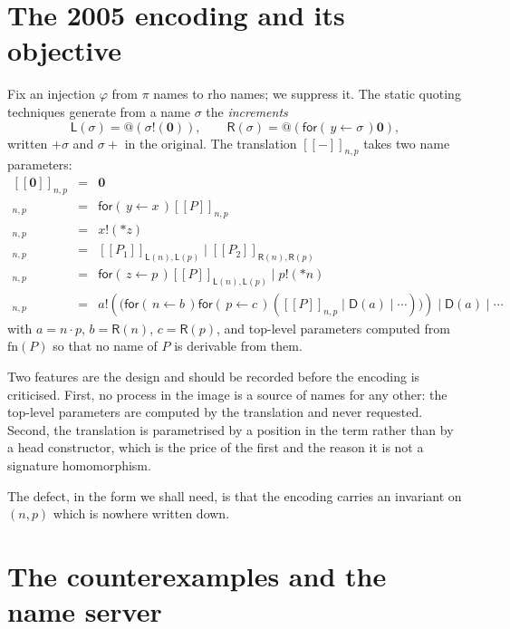 \documentclass[11pt]{article}
\makeatletter
\theoremstyle{definition}
\theoremstyle{plain}
\theoremstyle{remark}
\newcommand{\quo}[1]{@#1}
\newcommand{\drp}[1]{{*}#1}
\newcommand{\inp}[3]{\mathsf{for}(\,#1 \leftarrow #2\,)#3}
\newcommand{\out}[2]{#1!(#2)}
\newcommand{\enc}[1]{[\![#1]\!]}
\newcommand{\nil}{\mathbf{0}}
\newcommand{\Lft}{\mathsf{L}}
\newcommand{\Rgt}{\mathsf{R}}
\newcommand{\Dup}{\mathsf{D}}
\newcommand{\fn}{\mathrm{fn}}
\makeatother
\begin{document}
\section{The 2005 encoding and its objective}\label{sec:2005}

Fix an injection $\varphi$ from $\pi$ names to rho names; we suppress it.
The static quoting techniques generate from a name $\sigma$ the
\emph{increments}
\[
  \Lft(\sigma) = \quo{(\out{\sigma}{\nil})},
  \qquad
  \Rgt(\sigma) = \quo{(\inp{y}{\sigma}{\nil})},
\]
written $+\sigma$ and $\sigma{+}$ in the original. The translation
$\enc{-}_{n,p}$ takes two name parameters:
\[
\begin{array}{rcl}
\enc{\nil}_{n,p} &=& \nil \\
\enc{x(y).P}_{n,p} &=& \inp{y}{x}{\enc{P}_{n,p}} \\
\enc{\bar x \langle z\rangle}_{n,p} &=& \out{x}{\drp{z}} \\
\enc{P_1 \mid P_2}_{n,p} &=& \enc{P_1}_{\Lft(n),\Lft(p)} \mid \enc{P_2}_{\Rgt(n),\Rgt(p)} \\
\enc{(\nu z)P}_{n,p} &=& \inp{z}{p}{\enc{P}_{\Lft(n),\Lft(p)}} \mid \out{p}{\drp{n}} \\
\enc{!P}_{n,p} &=& \out{a}{\big(\inp{n}{b}{\inp{p}{c}{(\enc{P}_{n,p} \mid \Dup(a) \mid \cdots)}}\big)} \mid \Dup(a) \mid \cdots
\end{array}
\]
with $a = n\cdot p$, $b = \Rgt(n)$, $c = \Rgt(p)$, and top-level
parameters computed from $\fn(P)$ so that no name of $P$ is derivable
from them.

Two features are the design and should be recorded before the encoding is
criticised. First, no process in the image is a source of names for any
other: the top-level parameters are computed by the translation and never
requested. Second, the translation is parametrised by a position in the
term rather than by a head constructor, which is the price of the first
and the reason it is not a signature homomorphism.

The defect, in the form we shall need, is that the encoding carries an
invariant on $(n,p)$ which is nowhere written down.

\section{The counterexamples and the name server}\label{sec:lybech}
\end{document}
